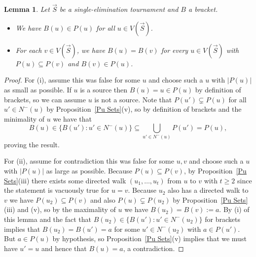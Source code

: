 \documentclass[12pt,letterpaper]{article}
\newtheorem{lem}[thm]{Lemma}
\theoremstyle{definition}
\renewcommand{\1}{\mathbbm{1}}
\newcommand{\sub}{\subseteq}
\newcommand{\tour}{\vec{S}}
\begin{document}
\begin{lem}\label{bracket facts}
	Let $\tour$ be a single-elimination tournament and $B$ a bracket.
	\begin{itemize}
		\item[(i)] We have $B(u)\in P(u)$ for all $u \in V(\tour)$.
		\item[(ii)] For each $v\in V(\tour)$, we have $B(u)=B(v)$ for every $u\in V(\tour)$ with $P(u)\sub P(v)$ and $B(v)\in P(u)$.
	\end{itemize}
\end{lem}
\begin{proof}
	For (i), assume this was false for some $u$ and choose such a $u$ with $|P(u)|$ as small as possible.  If $u$ is a source then $B(u)=u\in P(u)$ by definition of brackets, so we can assume $u$ is not a source.  Note that $P(u')\subsetneq P(u)$ for all $u'\in N^-(u)$ by Proposition~\ref{Pu Sets}(v), so by definition of brackets and the minimality of $u$ we have that
	\[B(u)\in \{B(u'):u'\in N^-(u)\}\sub \bigcup_{u'\in N^-(u)} P(u')=P(u),\]
	proving the result.
	
	For (ii), assume for contradiction this was false for some $u,v$ and choose such a $u$ with $|P(u)|$ as large as possible.  Because $P(u)\sub P(v)$, by Proposition~\ref{Pu Sets}(iii) there exists some directed walk $(u_1,\ldots,u_t)$ from $u$ to $v$ with $t\ge 2$ since the statement is vacuously true for $u=v$.  Because $u_2$ also has a directed walk to $v$ we have $P(u_2)\sub P(v)$ and also $P(u)\subsetneq P(u_2)$ by Proposition~\ref{Pu Sets}(iii) and (v), so by the maximality of $u$ we have $B(u_2)=B(v):=a$.  By (i) of this lemma and the fact that $B(u_2)\in \{B(u'):u'\in N^-(u_2)\}$ for brackets implies that $B(u_2)=B(u')=a$ for some $u'\in N^-(u_2)$ with $a\in P(u')$.  But $a\in P(u)$ by hypothesis, so Proposition~\ref{Pu Sets}(v) implies that we must have $u'=u$ and hence that $B(u)=a$, a contradiction.
\end{proof}
\end{document}

